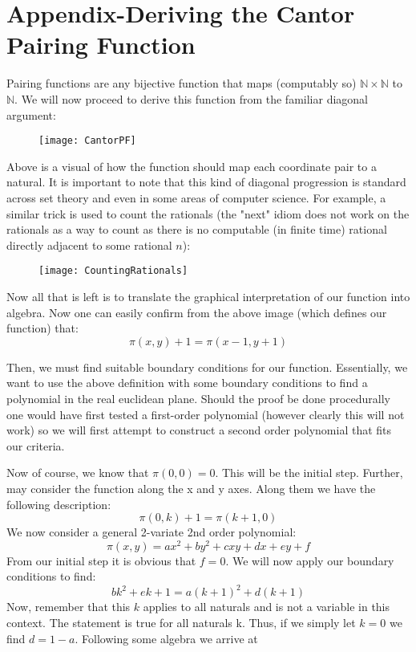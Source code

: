 \documentclass{article}
\begin{document}
\section{Appendix-Deriving the Cantor Pairing Function}
\par Pairing functions are any bijective function that maps (computably so) $\mathbb{N} \times \mathbb{N}$ to $\mathbb{N}$. We will now proceed to derive this function from the familiar diagonal argument: 
\begin{figure}[h]
\texttt{[image: CantorPF]}
\centering
\end{figure}
\par Above is a visual of how the function should map each coordinate pair to a natural. It is important to note that this kind of diagonal progression is standard across set theory and even in some areas of computer science. For example, a similar trick is used to count the rationals (the "next" idiom does not work on the rationals as a way to count as there is no computable (in finite time) rational directly adjacent to some rational $n$): 
\begin{figure}[h]
\texttt{[image: CountingRationals]}
\centering
\end{figure}
\par Now all that is left is to translate the graphical interpretation of our function into algebra. Now one can easily confirm from the above image (which defines our function) that:
\[
\pi (x,y)+1=\pi (x-1,y+1)
\]
\par Then, we must find suitable boundary conditions for our function. Essentially, we want to use the above definition with some boundary conditions to find a polynomial in the real euclidean plane. Should the proof be done procedurally one would have first tested a first-order polynomial (however clearly this will not work) so we will first attempt to construct a second order polynomial that fits our criteria. 
\par Now of course, we know that $\pi(0,0)=0$. This will be the initial step. Further, may consider the function along the x and y axes. Along them we have the following description:
\[
\pi (0,k)+1=\pi (k+1,0)
\]
We now consider a general 2-variate 2nd order polynomial:
\[
\pi (x,y)=ax^{2}+by^{2}+cxy+dx+ey+f
\]
From our initial step it is obvious that $f=0$. We will now apply our boundary conditions to find:
\[
bk^{2}+ek+1=a(k+1)^{2}+d(k+1)
\]
Now, remember that this $k$ applies to all naturals and is not a variable in this context. The statement is true for all naturals k. Thus, if we simply let $k=0$ we find $d=1-a$. Following some algebra we arrive at
\end{document}
